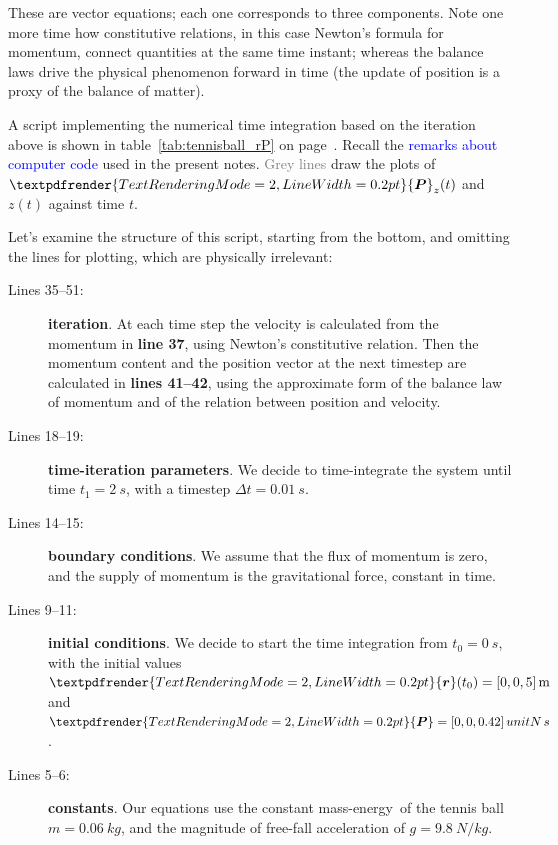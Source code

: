 \documentclass[a4paper,12pt,%
onecolumn,oneside,%
british%
]{memoir}
\renewcommand*{\bm}[1]{\textpdfrender{TextRenderingMode=2,LineWidth=0.2pt}{\boldsymbol{#1}}}
\newcommand*{\incr}{\Delta}%
\renewcommand*{\|}[1][]{\nonscript\:#1\vert\nonscript\:\mathopen{}}
\newcommand*{\sect}{\S}%
\renewcommand*{\autoref}[3][\sect\,\ref]{\textcolor{blue}{#3}
\raisebox{0.6ex}{\color{blue}\miniscule%
\faIcon{angle-right}%
\;#1{#2}\;p.\,\pageref{#2}}}
\newcommand*{\masse}{mass-energy}
\newcommand*{\yr}{\bm{r}}
\newcommand*{\yti}{t_{0}}
\newcommand*{\ytf}{t_{1}}
\newcommand*{\Dt}{\incr t}
\newcommand*{\ym}{m}%
\newcommand*{\yP}{\bm{P}}
\begin{document}
These are vector equations; each one corresponds to three components. Note one more time how constitutive relations, in this case Newton's formula for momentum, connect quantities at the same time instant; whereas the balance laws drive the physical phenomenon forward in time (the update of position is a proxy of the balance of matter).

\medskip

A script implementing the numerical time integration based on the iteration above is shown in table~\ref{tab:tennisball_rP} on page~\pageref{tab:tennisball_rP}. Recall the \autoref{sec:code}{remarks about computer code} used in the present notes. \textcolor{grey}{Grey lines} draw the plots of $\yP_{z}(t)$ and $z(t)$ against time $t$.

Let's examine the structure of this script, starting from the bottom, and omitting the lines for plotting, which are physically irrelevant:
\begin{description}
\item[Lines 35--51:] \textbf{iteration}. At each time step the velocity is calculated from the momentum in \textbf{line 37}, using Newton's constitutive relation. Then the momentum content and the position vector at the next timestep are calculated in \textbf{lines 41--42}, using the approximate form of the balance law of momentum and of the relation between position and velocity.
\item[Lines 18--19:] \textbf{time-iteration parameters}. We decide to time-integrate the system until time $\ytf = \qty{2}{s}$, with a timestep $\Dt = \qty{0.01}{s}$.
\item[Lines 14--15:] \textbf{boundary conditions}. We assume that the flux of momentum is zero, and the supply of momentum is the gravitational force, constant in time.
\item[Lines 9--11:] \textbf{initial conditions}. We decide to start the time integration from $\yti = \qty{0}{s}$, with the initial values $\yr(\yti) = [0,0,5]\,\unit{m}$ and $\yP = [0,0,\num{0.42}]\,unit{N\,s}$.
\item[Lines 5--6:] \textbf{constants}. Our equations use the constant \masse\ of the tennis ball $\ym = \qty{0.06}{kg}$, and the magnitude of free-fall acceleration of  $g = \qty{9.8}{N/kg}$.
\end{description}
\end{document}
